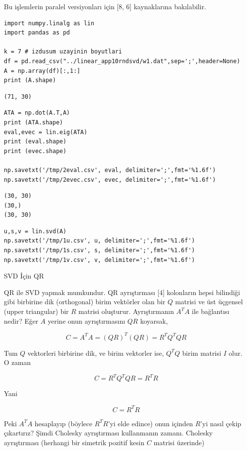 \documentclass[12pt,fleqn]{article}\usepackage{../../common}
\begin{document}
Bu işlemlerin paralel versiyonları için [8, 6] kaynaklarına bakılabilir.


\begin{verbatim}
import numpy.linalg as lin
import pandas as pd

k = 7 # izdusum uzayinin boyutlari
df = pd.read_csv("../linear_app10rndsvd/w1.dat",sep=';',header=None)
A = np.array(df)[:,1:]
print (A.shape)
\end{verbatim}

\begin{verbatim}
(71, 30)
\end{verbatim}

\begin{verbatim}
ATA = np.dot(A.T,A)
print (ATA.shape)
eval,evec = lin.eig(ATA)
print (eval.shape)
print (evec.shape)

np.savetxt('/tmp/2eval.csv', eval, delimiter=';',fmt='%1.6f')
np.savetxt('/tmp/2evec.csv', evec, delimiter=';',fmt='%1.6f')
\end{verbatim}

\begin{verbatim}
(30, 30)
(30,)
(30, 30)
\end{verbatim}

\begin{verbatim}
u,s,v = lin.svd(A)
np.savetxt('/tmp/1u.csv', u, delimiter=';',fmt='%1.6f')
np.savetxt('/tmp/1s.csv', s, delimiter=';',fmt='%1.6f')
np.savetxt('/tmp/1v.csv', v, delimiter=';',fmt='%1.6f')
\end{verbatim}




SVD İçin QR

QR ile SVD yapmak mumkundur. QR ayrıştırması [4] kolonların hepsi bilindiği gibi
birbirine dik (orthogonal) birim vektörler olan bir $Q$ matrisi ve üst üçgensel
(upper triangular) bir $R$ matrisi oluşturur. Ayrıştırmanın $A^TA$ ile
bağlantısı nedir? Eğer $A$ yerine onun ayrıştırmasını $QR$ koyarsak,

$$
C = A^TA = (QR)^T (QR) = R^T Q^T QR
$$

Tum $Q$ vektorleri birbirine dik, ve birim vektorler ise, $Q^T Q$
birim matrisi $I$ olur. O zaman

$$
C = R^T Q^T QR = R^T R
$$

Yani

$$
C = R^TR
$$

Peki $A^TA$ hesaplayıp (böylece $R^TR$'yi elde edince) onun içinden $R$'yi nasıl
çekip çıkartırız? Şimdi Cholesky ayrıştırması kullanmanın zamanı. Cholesky
ayrıştırması (herhangi bir simetrik pozitif kesin $C$ matrisi üzerinde)
\end{document}
